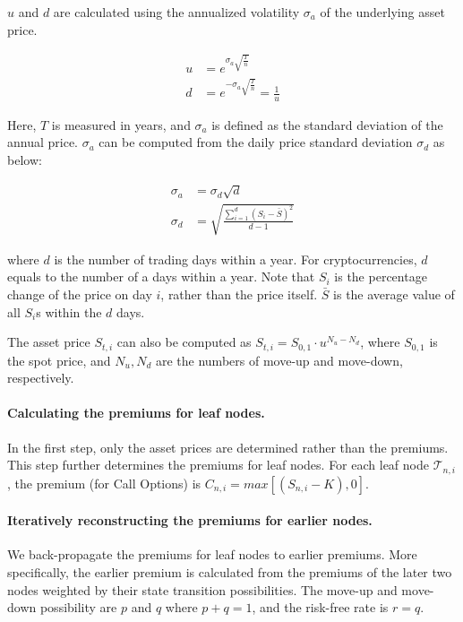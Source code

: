 $u$ and $d$ are calculated using the annualized volatility $\sigma_a$ of the underlying asset price.

\begin{align} 
u &= e^{\sigma_a \sqrt{\frac{T}{n}}}\\
d &= e^{- \sigma_a \sqrt{\frac{T}{n}}} = \frac{1}{u}
\end{align}

Here, $T$ is measured in years, and $\sigma_a$ is defined as the standard deviation of the annual price.
$\sigma_a$ can be computed from the daily price standard deviation $\sigma_d$ as below:

\begin{align} 
\sigma_a &= \sigma_d \sqrt{d}\\
\sigma_d &= \sqrt{\frac{\sum^{d}_{i=1} (S_i - \bar{S})^2}{d-1}}
\end{align}

where $d$ is the number of trading days within a year.
For cryptocurrencies, $d$ equals to the number of a days within a year.
Note that $S_i$ is the percentage change of the price on day $i$, rather than the price itself.
$\bar{S}$ is the average value of all $S_i$s within the $d$ days. 

The asset price $S_{t, i}$ can also be computed as $S_{t, i} = S_{0, 1} \cdot u^{N_u - N_d}$, where $S_{0, 1}$ is the spot price, and $N_u, N_d$ are the numbers of move-up and move-down, respectively.

\paragraph{Calculating the premiums for leaf nodes.}
In the first step, only the asset prices are determined rather than the premiums.
This step further determines the premiums for leaf nodes.
For each leaf node $\mathcal{T}_{n, i}$, the premium (for Call Options) is $C_{n, i} = max[(S_{n, i} - K), 0]$.

\paragraph{Iteratively reconstructing the premiums for earlier nodes.}
We back-propagate the premiums for leaf nodes to earlier premiums.
More specifically, the earlier premium is calculated from the premiums of the later two nodes weighted by their state transition possibilities.
The move-up and move-down possibility are $p$ and $q$ where $p + q = 1$, and the risk-free rate is $r = q$.

